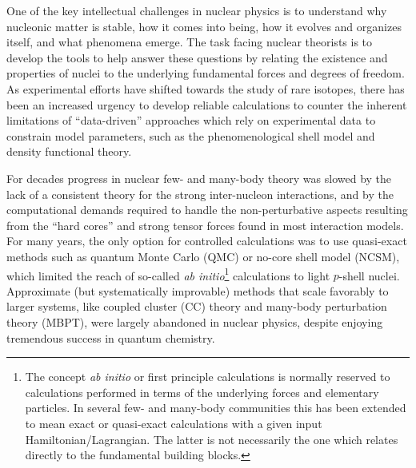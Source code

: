 \documentclass[10pt]{article}
\begin{document}
One of the key intellectual challenges in nuclear physics is to understand
why nucleonic matter is stable, how it comes into being, how it
evolves and organizes itself, and what phenomena emerge. The task
facing nuclear theorists is to develop the tools to help answer these
questions by relating the existence and properties of nuclei to the
underlying fundamental forces and degrees of freedom. As experimental
efforts have shifted towards the study of rare
isotopes, there
has been an increased urgency to develop reliable 
calculations to counter the inherent limitations of ``data-driven''
approaches which rely on experimental data to constrain model
parameters, such as the phenomenological shell model and density
functional theory. 

For decades progress in nuclear few- and many-body theory was slowed
by the lack of a consistent theory for the strong inter-nucleon
interactions, and by the computational demands required to handle the
non-perturbative aspects resulting from the ``hard cores'' and strong
tensor forces found in most interaction models.  For many years, the
only option for controlled calculations was to use quasi-exact methods
such as quantum Monte Carlo (QMC) or no-core shell model (NCSM), which
limited the reach of so-called \emph{ab initio}\footnote{The concept
  \emph{ab initio} or first principle calculations is normally
  reserved to calculations performed in terms of the underlying forces
  and elementary particles. In several few- and many-body communities
  this has been extended to mean exact or quasi-exact calculations
  with a given input Hamiltonian/Lagrangian. The latter is not
  necessarily the one which relates directly to the fundamental
  building blocks.} calculations to light $p$-shell nuclei. Approximate
(but systematically improvable) methods that scale favorably to larger
systems, like coupled cluster (CC) theory and many-body perturbation
theory (MBPT), were largely abandoned in nuclear physics, despite
enjoying tremendous success in quantum chemistry.
\end{document}
